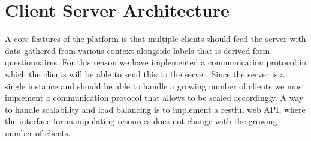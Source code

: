 
\chapter{Client Server Architecture}

A core features of the platform is that multiple clients should feed the server with data gathered from various context alongside labels that is derived form questionnaires. For this reason we have implemented a communication protocol in which the clients will be able to send this to the server. Since the server is a single instance and should be able to handle a growing number of clients we must implement a communication protocol that allows to be scaled accordingly. A way to handle scalability and load balancing is to implement a restful web API, where the interface for manipulating resources does not change with the growing number of clients.




